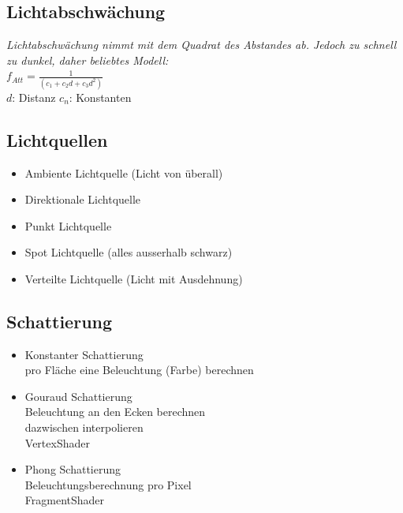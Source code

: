 \subsection{Lichtabschwächung}

\textit{Lichtabschwächung nimmt mit dem Quadrat des Abstandes ab.
Jedoch zu schnell zu dunkel, daher beliebtes Modell:} \\

$f_{Att} = \frac{1}{(c_1 + c_2 d + c_3 d^2)}$ \\

$d$: Distanz
$c_n$: Konstanten

\subsection{Lichtquellen}

\begin{itemize}
    \item Ambiente Lichtquelle (Licht von überall)
    \item Direktionale Lichtquelle
    \item Punkt Lichtquelle
    \item Spot Lichtquelle (alles ausserhalb schwarz)
    \item Verteilte Lichtquelle (Licht mit Ausdehnung)
\end{itemize}

\subsection{Schattierung}

\begin{itemize}
    \item Konstanter Schattierung \\
    pro Fläche eine Beleuchtung (Farbe) berechnen

    \item Gouraud Schattierung \\
    Beleuchtung an den Ecken berechnen \\
    dazwischen interpolieren \\
    VertexShader

    \item Phong Schattierung \\
    Beleuchtungsberechnung pro Pixel \\
    FragmentShader
\end{itemize}